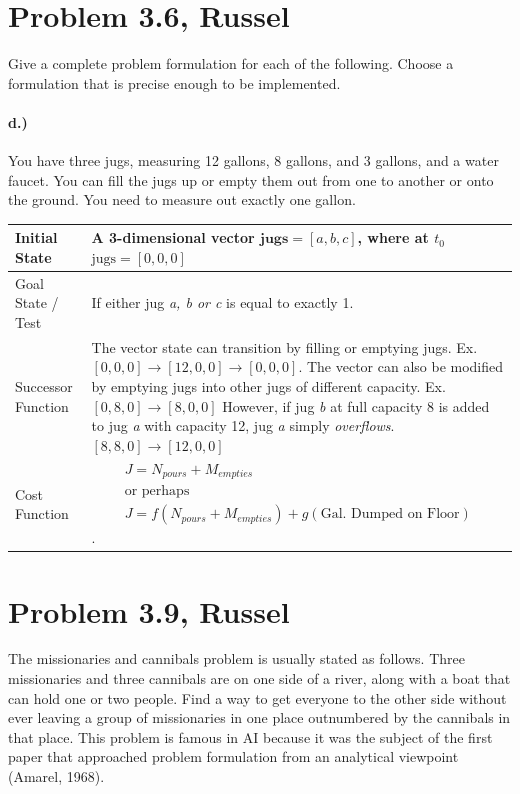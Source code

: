 \documentclass[12pt]{article}
\begin{document}
\maketitle

\section{Problem 3.6, Russel}
Give a complete problem formulation for each of the following. Choose a formulation
that is precise enough to be implemented. 

\paragraph{\textbf{d.)}} You have three jugs, measuring 12 gallons, 8 gallons, and 3 gallons, and a water faucet. You can fill the jugs up or empty them out from one to another or onto the ground. You
need to measure out exactly one gallon.
\begin{center}
    \begin{tabular}{ | l | p{10cm} |}
    \hline
	Initial State & A 3-dimensional vector $\textbf{jugs} = [a,b,c] $, where at $t_0$ $\text{jugs}= [0,0,0]$\\
	\hline
	Goal State / Test & If either jug \textit{a, b or c} is equal to exactly 1.\\
	\hline
	Successor Function & The vector state can transition by filling or emptying jugs. Ex. $[0,0,0] \rightarrow [12,0,0] 
	\rightarrow [0,0,0]$. The vector can also be modified by emptying jugs into other jugs of different capacity. Ex. $[0,8,0]
	\rightarrow [8,0,0]$ However, if jug \textit{b} at full capacity 8 is added to jug \textit{a} with capacity 12, jug
	\textit{a} simply \textit{overflows}. $[8,8,0]
	\rightarrow [12,0,0]$\\   
	\hline
	Cost Function &\begin{gather*}J = N_{pours} + M_{empties} \\ 
	\text{or perhaps}\\ 
	J = f(N_{pours} + M_{empties}) + g(\text{Gal. Dumped on Floor})
	\end{gather*}.
	\\
	\hline
    \end{tabular}
\end{center}

\section{Problem 3.9, Russel}
The missionaries and cannibals problem is usually stated as follows. Three missionaries
and three cannibals are on one side of a river, along with a boat that can hold one or
two people. Find a way to get everyone to the other side without ever leaving a group of missionaries
in one place outnumbered by the cannibals in that place. This problem is famous in
AI because it was the subject of the first paper that approached problem formulation from an
analytical viewpoint (Amarel, 1968).
\end{document}
